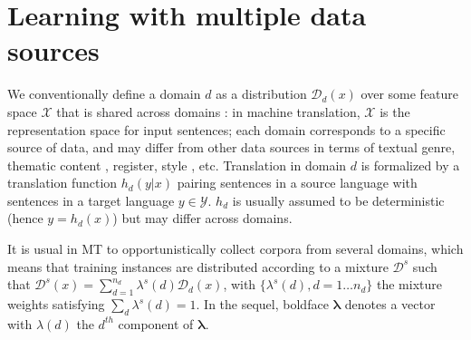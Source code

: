 \documentclass[11pt]{article}
\newcommand{\vlambda}{\ensuremath{\boldsymbol\lambda}\xspace} %
\begin{document}
\section{Learning with multiple data sources} \label{sec:mdmt}

We conventionally define a domain $d$ as a distribution $\mathcal{D}_d(x)$ over some feature space $\mathcal{X}$ that is shared across domains \cite{Pan10asurvey}: in machine translation, $\mathcal{X}$ is the representation space for input sentences; each domain corresponds to a specific source of data, and may differ from other data sources in terms of textual genre, thematic content \cite{Chen16guided,Zhang16topicinformed}, register, style \cite{Niu18multitask}, etc. Translation in domain $d$ is formalized by a translation function $h_d(y|x)$ pairing sentences in a source language with sentences in a target language $y \in \mathcal{Y}$. $h_d$ is usually assumed to be deterministic (hence $y = h_d(x)$) but may differ across domains.

It is usual in MT to opportunistically collect corpora from several domains, which means that training instances are distributed according to a mixture $\mathcal{D}^s$ such that $\mathcal{D}^s(x) = \sum_{d=1}^{n_d} \lambda^{s}(d) \mathcal{D}_d(x)$, with $\{\lambda^{s}(d), d=1 \dots n_d\}$ the mixture weights satisfying $\sum_d \lambda^{s}(d)=1$. In the sequel, boldface $\vlambda$ denotes a vector with $\lambda(d)$ the $d^{th}$ component of $\vlambda$.
\end{document}
